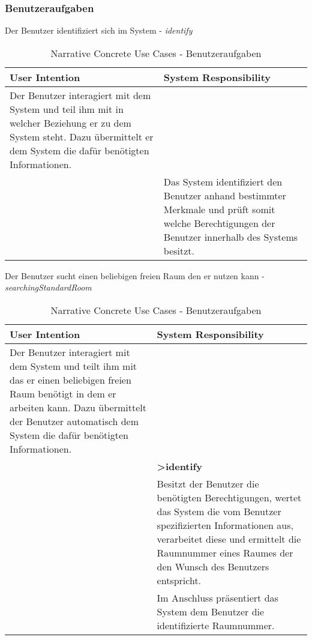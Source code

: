 \subsubsection{Benutzeraufgaben}
\begin{table}[h]
	\caption{Narrative Concrete Use Cases - Benutzeraufgaben}
	Der Benutzer identifiziert sich im System - \textit{identify}\\
	\begin{tabularx}{\textwidth}{|X|X|}
	\rowcolor{heading} \textbf{User Intention} & \textbf{System Responsibility}\\ \hline
	Der Benutzer interagiert mit dem System und teil ihm mit in welcher Beziehung er zu dem System steht. Dazu übermittelt er dem System die dafür benötigten Informationen. & \\  \hline
	 & Das System identifiziert den Benutzer anhand bestimmter Merkmale und prüft somit welche Berechtigungen der Benutzer innerhalb des Systems besitzt. \\ \hline
	\end{tabularx}
	
	Der Benutzer sucht einen beliebigen freien Raum den er nutzen kann - \textit{searchingStandardRoom}\\
	\begin{tabularx}{\textwidth}{|X|X|}
	\rowcolor{heading} \textbf{User Intention} & \textbf{System Responsibility}\\ \hline
	Der Benutzer interagiert mit dem System und teilt ihm mit das er einen beliebigen freien Raum benötigt in dem er arbeiten kann. Dazu übermittelt der Benutzer automatisch dem System die dafür benötigten Informationen. & \\  \hline
	 & \textbf{>identify} \\ \hline
	 & Besitzt der Benutzer die benötigten Berechtigungen, wertet das System die vom Benutzer spezifizierten Informationen aus, verarbeitet diese und ermittelt die Raumnummer eines Raumes der den Wunsch des Benutzers entspricht.\\ \hline
	 & Im Anschluss präsentiert das System dem Benutzer die identifizierte Raumnummer.\\ \hline
	\end{tabularx}
\end{table}


